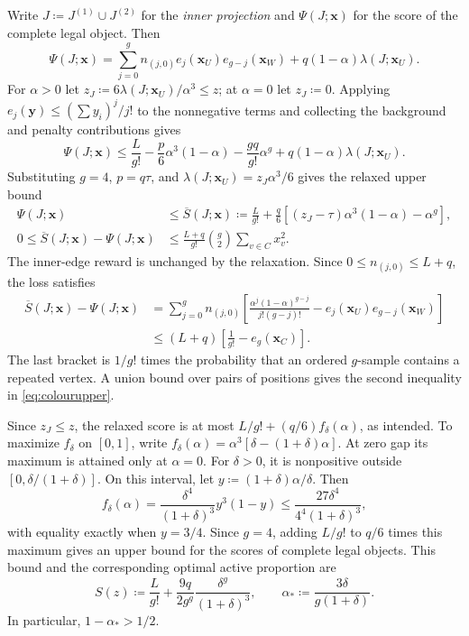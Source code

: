 \documentclass[10pt]{article}
\numberwithin{equation}{section}
\theoremstyle{definition}
\newcommand{\x}{\boldsymbol{x}}\newcommand{\y}{\boldsymbol{y}}
\begin{document}
Write $J\coloneqq J^{(1)}\cup J^{(2)}$ for the \emph{inner projection} and $\Psi(J;\x)$ for the score of the complete legal object. Then
\[
 \Psi(J;\x)=\sum_{j=0}^g n_{(j,0)} e_j(\x_U)e_{g-j}(\x_W)
                      +q(1-\alpha)\lambda(J;\x_U).
\]
For $\alpha>0$ let $z_J\coloneqq 6\lambda(J;\x_U)/\alpha^3\le z$; at $\alpha=0$ let $z_J\coloneqq0$. Applying $e_j(\y)\le(\sum y_i)^j/j!$ to the nonnegative terms and collecting the background and penalty contributions gives
\[
 \Psi(J;\x)\le\frac L{g!}-\frac p6\alpha^3(1-\alpha)
       -\frac{gq}{g!}\alpha^g+q(1-\alpha)\lambda(J;\x_U).
\]
Substituting $g=4$, $p=q\tau$, and $\lambda(J;\x_U)=z_J\alpha^3/6$ gives the relaxed upper bound
\begin{equation}\label{eq:colourupper}
 \begin{aligned}
 \Psi(J;\x)&\le\overline S(J;\x)\coloneqq\frac L{g!}+\frac q{6}
       [(z_J-\tau)\alpha^3(1-\alpha)-\alpha^g],\\
 0\le\overline S(J;\x)-\Psi(J;\x)
       &\le\frac{L+q}{g!}\binom g2\sum_{v\in C}x_v^2.
 \end{aligned}
\end{equation}
The inner-edge reward is unchanged by the relaxation. Since $0\le n_{(j,0)}\le L+q$, the loss satisfies
\[
 \begin{aligned}
 \overline S(J;\x)-\Psi(J;\x)
 &=\sum_{j=0}^g n_{(j,0)}
   \left[\frac{\alpha^j(1-\alpha)^{g-j}}{j!(g-j)!}
         -e_j(\x_U)e_{g-j}(\x_W)\right]\\
 &\le(L+q)\left[\frac1{g!}-e_g(\x_C)\right].
 \end{aligned}
\]
The last bracket is $1/g!$ times the probability that an ordered $g$-sample contains a repeated vertex. A union bound over pairs of positions gives the second inequality in \eqref{eq:colourupper}.

Since $z_J\le z$, the relaxed score is at most $L/g!+(q/6)f_\delta(\alpha)$, as intended. To maximize $f_\delta$ on $[0,1]$, write $f_\delta(\alpha)=\alpha^3[\delta-(1+\delta)\alpha]$. At zero gap its maximum is attained only at $\alpha=0$. For $\delta>0$, it is nonpositive outside $[0,\delta/(1+\delta)]$. On this interval, let $y\coloneqq(1+\delta)\alpha/\delta$. Then
\[
 f_\delta(\alpha)=\frac{\delta^4}{(1+\delta)^3}y^3(1-y)
 \le\frac{27\delta^4}{4^4(1+\delta)^3},
\]
with equality exactly when $y=3/4$. Since $g=4$, adding $L/g!$ to $q/6$ times this maximum gives an upper bound for the scores of complete legal objects. This bound and the corresponding optimal active proportion are
\begin{equation}\label{eq:phasefunction}
 S(z)\coloneqq\frac L{g!}+\frac{9q}{2g^g}
                       \frac{\delta^g}{(1+\delta)^3},\qquad
 \alpha_*\coloneqq\frac{3\delta}{g(1+\delta)}.
\end{equation}
In particular, $1-\alpha_*>1/2$.
\end{document}
